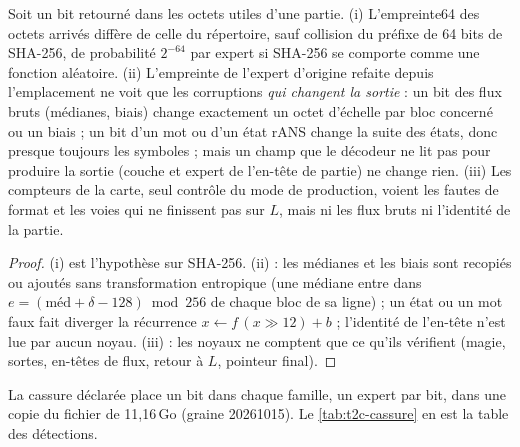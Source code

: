 \begin{proposition}\label{prop:t2c-controles}
Soit un bit retourné dans les octets utiles d'une partie. (i) L'empreinte64 des octets arrivés diffère de celle du répertoire, sauf collision du préfixe de 64 bits de SHA-256, de probabilité $2^{-64}$ par expert si SHA-256 se comporte comme une fonction aléatoire. (ii) L'empreinte de l'expert d'origine refaite depuis l'emplacement ne voit que les corruptions \emph{qui changent la sortie} : un bit des flux bruts (médianes, biais) change exactement un octet d'échelle par bloc concerné ou un biais ; un bit d'un mot ou d'un état rANS change la suite des états, donc presque toujours les symboles ; mais un champ que le décodeur ne lit pas pour produire la sortie (couche et expert de l'en-tête de partie) ne change rien. (iii) Les compteurs de la carte, seul contrôle du mode de production, voient les fautes de format et les voies qui ne finissent pas sur $L$, mais ni les flux bruts ni l'identité de la partie.
\end{proposition}

\begin{proof}
(i) est l'hypothèse sur SHA-256. (ii) : les médianes et les biais sont recopiés ou ajoutés sans transformation entropique (une médiane entre dans $e = (\text{méd} + \delta - 128) \bmod 256$ de chaque bloc de sa ligne) ; un état ou un mot faux fait diverger la récurrence $x \leftarrow f\,(x \gg 12) + b$ ; l'identité de l'en-tête n'est lue par aucun noyau. (iii) : les noyaux ne comptent que ce qu'ils vérifient (magie, sortes, en-têtes de flux, retour à $L$, pointeur final).
\end{proof}

La cassure déclarée place un bit dans chaque famille, un expert par bit, dans une copie du fichier de 11,16\,Go (graine 20261015). Le \cref{tab:t2c-cassure} en est la table des détections.

